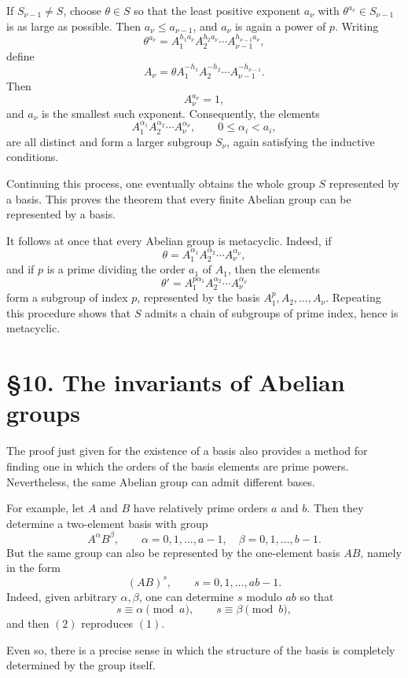 \documentclass[11pt,a4paper]{book}
\begin{document}
If \(S_{\nu-1}\neq S\), choose \(\theta\in S\) so that the least positive exponent \(a_\nu\) with \(\theta^{a_\nu}\in S_{\nu-1}\) is as large as possible. Then \(a_\nu\leq a_{\nu-1}\), and \(a_\nu\) is again a power of \(p\). Writing
\[
\theta^{a_\nu}=A_1^{h_1a_\nu}A_2^{h_2a_\nu}\cdots A_{\nu-1}^{h_{\nu-1}a_\nu},
\tag{17}
\]
define
\[
A_\nu=\theta A_1^{-h_1}A_2^{-h_2}\cdots A_{\nu-1}^{-h_{\nu-1}}.
\tag{18}
\]
Then
\[
A_\nu^{a_\nu}=1,
\tag{19}
\]
and \(a_\nu\) is the smallest such exponent. Consequently, the elements
\[
A_1^{\alpha_1}A_2^{\alpha_2}\cdots A_\nu^{\alpha_\nu},
\qquad
0\leq \alpha_i<a_i,
\tag{20}
\]
are all distinct and form a larger subgroup \(S_\nu\), again satisfying the inductive conditions.

Continuing this process, one eventually obtains the whole group \(S\) represented by a basis. This proves the theorem that every finite Abelian group can be represented by a basis.

It follows at once that every Abelian group is metacyclic. Indeed, if
\[
\theta=A_1^{\alpha_1}A_2^{\alpha_2}\cdots A_\nu^{\alpha_\nu},
\]
and if \(p\) is a prime dividing the order \(a_1\) of \(A_1\), then the elements
\[
\theta'=A_1^{p\alpha_1}A_2^{\alpha_2}\cdots A_\nu^{\alpha_\nu}
\]
form a subgroup of index \(p\), represented by the basis \(A_1^p,A_2,\dots,A_\nu\). Repeating this procedure shows that \(S\) admits a chain of subgroups of prime index, hence is metacyclic.

\section*{\S 10. The invariants of Abelian groups}

The proof just given for the existence of a basis also provides a method for finding one in which the orders of the basis elements are prime powers. Nevertheless, the same Abelian group can admit different bases.

For example, let \(A\) and \(B\) have relatively prime orders \(a\) and \(b\). Then they determine a two-element basis with group
\[
A^\alpha B^\beta,
\qquad
\alpha=0,1,\dots,a-1,\quad \beta=0,1,\dots,b-1.
\tag{1}
\]
But the same group can also be represented by the one-element basis \(AB\), namely in the form
\[
(AB)^s,
\qquad
s=0,1,\dots,ab-1.
\tag{2}
\]
Indeed, given arbitrary \(\alpha,\beta\), one can determine \(s\) modulo \(ab\) so that
\[
s\equiv \alpha \pmod a,\qquad s\equiv \beta \pmod b,
\]
and then \((2)\) reproduces \((1)\).

Even so, there is a precise sense in which the structure of the basis is completely determined by the group itself.
\end{document}
